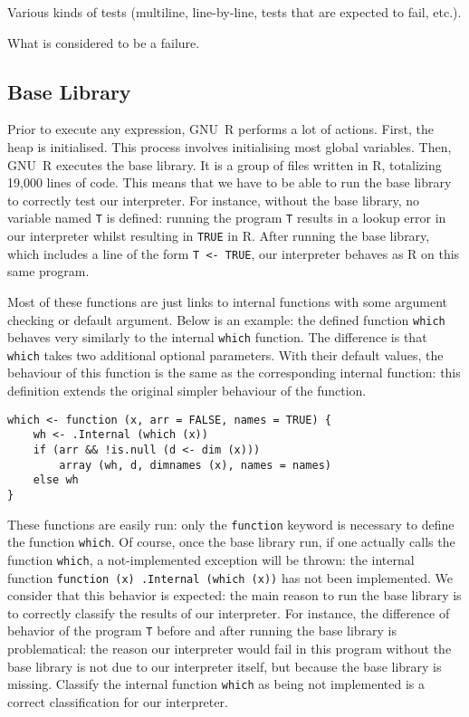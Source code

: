 \documentclass[
    sigplan,
    10pt,
    review, %
    natbib=false %
 ]{acmart}
\begin{document}
Various kinds of tests (multiline, line-by-line, tests that are expected to fail, etc.).

What is considered to be a failure.

\subsection{Base Library}
\label{sec:library}

Prior to execute any expression, GNU~R performs a lot of actions.
First, the heap is initialised.
This process involves initialising most global variables.
Then, GNU~R executes the base library.
It is a group of files written in R,
totalizing 19,000 lines of code.
%
This means that we have to be able to run the base library
to correctly test our interpreter.
For instance, without the base library,
no variable named \texttt{T} is defined:
running the program \texttt{T} results in a lookup error
in our interpreter whilst resulting in \texttt{TRUE} in R.
After running the base library,
which includes a line of the form \texttt{T <- TRUE},
our interpreter behaves as R on this same program.

Most of these functions are just links to internal functions
with some argument checking or default argument.
Below is an example:
the defined function \texttt{which} behaves very similarly
to the internal \texttt{which} function.
The difference is that \texttt{which} takes two additional
optional parameters.
With their default values, the behaviour of this function
is the same as the corresponding internal function:
this definition extends the original simpler behaviour of the function.
\begin{verbatim}
which <- function (x, arr = FALSE, names = TRUE) {
    wh <- .Internal (which (x))
    if (arr && !is.null (d <- dim (x)))
        array (wh, d, dimnames (x), names = names)
    else wh
}
\end{verbatim}

These functions are easily run:
only the \texttt{function} keyword is necessary
to define the function \texttt{which}.
Of course, once the base library run,
if one actually calls the function \texttt{which},
a not-implemented exception will be thrown:
the internal function \texttt{function (x) .Internal (which (x))}
has not been implemented.
%
We consider that this behavior is expected:
the main reason to run the base library is to correctly
classify the results of our interpreter.
For instance, the difference of behavior of the program \texttt{T}
before and after running the base library is problematical:
the reason our interpreter would fail in this program without the base library
is not due to our interpreter itself, but because the base library is missing.
Classify the internal function \texttt{which} as being not implemented
is a correct classification for our interpreter.
\end{document}
